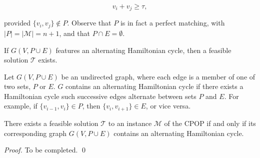\documentclass[oribibl]{llncs}
\begin{document}
\begin{equation}
	\label{eqn:jointsum}
	v_i + v_j \geq \tau,
\end{equation}

provided $\{v_i, v_j\} \notin P$. Observe that $P$ is in fact a perfect matching, with $|P| = |\mathcal{M}| = n+1$, and that $P \cap E = \emptyset$.

If $G(V, P\cup E)$ features an alternating Hamiltonian cycle, then a feasible solution $\mathcal{T}$ exists.

\begin{definition}
	\label{defn:althamcycle}
	Let $G(V, P\cup E)$ be an undirected graph, where each edge is a member of one of two sets, $P$ or $E$. $G$ contains an alternating Hamiltonian cycle if there exists a Hamiltonian cycle such successive edges alternate between sets $P$ and $E$. For example, if $\{v_{i-1}, v_i\} \in P$, then $\{v_i, v_{i+1}\} \in E$, or vice versa.
\end{definition}

\begin{theorem}
	\label{thm:cpopsolnalt}
	There exists a feasible solution $\mathcal{T}$ to an instance $\mathcal{M}$ of the CPOP if and only if its corresponding graph $G(V, P\cup E)$ contains an alternating Hamiltonian cycle.
\end{theorem}
\begin{proof}
	To be completed. \qed
\end{proof}









































\end{document}
